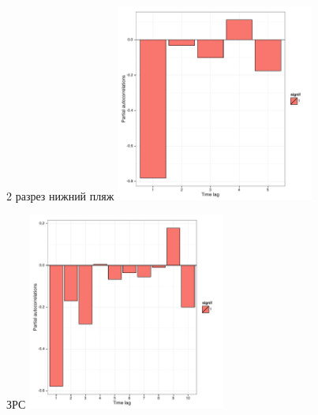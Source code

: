 \documentclass[12pt, a4paper]{disser}
\begin{document}
\begin{figure}[ht]
	\begin{minipage}[b]{.46\linewidth}
	\begin{center}
	{\tiny 2 разрез нижний пляж}
	\includegraphics[width=65mm]{../White_Sea/oneyear_all_Kandalaksha_all/perm_PRCF_razrez2_low_beatch_N1y.pdf}
	\end{center}
	\end{minipage}
%
	\hfil %
%
	\begin{minipage}[b]{.46\linewidth}
	\begin{center}	
	{\tiny ЗРС}
	\includegraphics[width=65mm]{../White_Sea/oneyear_all_Kandalaksha_all/perm_PRCF_ZRS_N1y.pdf}
	\end{center}
	\end{minipage}



\end{figure}
\end{document}
